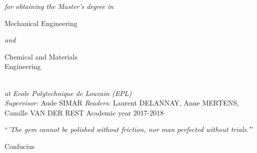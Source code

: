 \documentclass[
11pt, %
british, %
singlespacing, %
headsepline, %
]{MastersDoctoralThesis} %
\begin{document}
\begin{titlepage}
\begin{center}
\vspace{0.6cm}
\large \textit{for obtaining the Master’s degree in}\\[0.3cm] 
\vspace{0.20cm}
\begin{minipage}[t]{0.41\textwidth}
\begin{flushleft} \large
Mechanical Engineering
\end{flushleft}
\end{minipage}
\large \textit{and}
\begin{minipage}[t]{0.4\textwidth}
\begin{flushright} \large
Chemical and Materials \\
\centering \hspace{0.7cm} Engineering
\end{flushright}
\end{minipage}\\%
\vspace{0.7cm}
\large \textit{at Ecole Polytechnique de Louvain (EPL)}\\[1.3cm]
\vfill
\large {\textit{Supervisor:} Aude SIMAR}
\vfill
 \large {\textit{Readers:} Laurent DELANNAY, Anne MERTENS, Camille VAN DER REST}
\vfill
{\large Academic year 2017-2018}\\%
 

\end{center}
\end{titlepage}


\vspace*{0.2\textheight}

\noindent\enquote{\itshape 'The gem cannot be polished without friction, nor man perfected without trials.'}\bigbreak

\hfill Confucius

\end{document}
